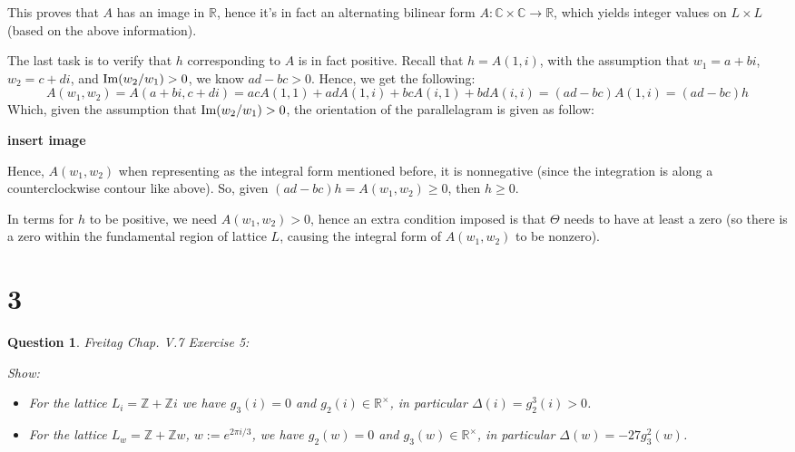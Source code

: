 \documentclass{article}
\newtheorem{question}{Question}
\begin{document}
\begin{itemize}
    \hfil

    This proves that $A$ has an image in $\mathbb{R}$, hence it's in fact an alternating bilinear form $A:\mathbb{C}\times\mathbb{C}\rightarrow\mathbb{R}$, which yields integer values on $L\times L$ (based on the above information). 

    The last task is to verify that $h$ corresponding to $A$ is in fact positive. Recall that $h=A(1,i)$, with the assumption that $w_1=a+bi$, $w_2=c+di$, and $\textmd{Im}(w_2/w_1)>0$, we know $ad-bc > 0$. Hence, we get the following:
    $$A(w_1,w_2) =A(a+bi,c+di) = acA(1,1)+adA(1,i)+bcA(i,1)+bdA(i,i) = (ad-bc)A(1,i) = (ad-bc)h$$
    Which, given the assumption that $\textmd{Im}(w_2/w_1)>0$, the orientation of the parallelagram is given as follow:

    \textbf{insert image}

    Hence, $A(w_1,w_2)$ when representing as the integral form mentioned before, it is nonnegative (since the integration is along a counterclockwise contour like above). So, given $(ad-bc)h = A(w_1,w_2)\geq 0$, then $h \geq 0$.

    In terms for $h$ to be positive, we need $A(w_1,w_2)>0$, hence an extra condition imposed is that $\Theta$ needs to have at least a zero (so there is a zero within the fundamental region of lattice $L$, causing the integral form of $A(w_1,w_2)$ to be nonzero).
\end{itemize}

\break

\section*{3}
\begin{myBox}[]{}
    \begin{question}
        Freitag Chap. V.7 Exercise 5:

        Show:
        \begin{itemize}
            \item[(a)] For the lattice $L_i=\mathbb{Z}+\mathbb{Z}i$ we have $g_3(i)=0$ and $g_2(i)\in\mathbb{R}^\times$, in particular $\Delta(i)=g_2^3(i)>0$.
            \item[(b)] For the lattice $L_w=\mathbb{Z}+\mathbb{Z}w$, $w:=e^{2\pi i/3}$, we have $g_2(w)=0$ and $g_3(w)\in\mathbb{R}^\times$, in particular $\Delta(w)=-27g_3^2(w)$. 
        \end{itemize}
    \end{question}
\end{myBox}
\end{document}

